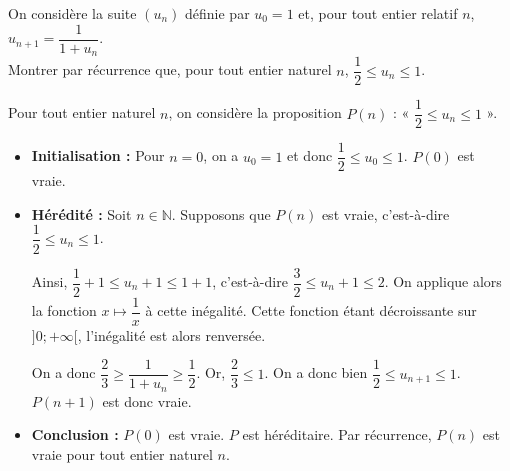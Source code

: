 \documentclass[11pt,fleqn]{book} %
\begin{document}
\begin{exercise}
On considère la suite $(u_n)$ définie par $u_0=1$ et, pour tout entier relatif $n$, $u_{n+1}=\dfrac{1}{1+u_n}$.\\ Montrer par récurrence que, pour tout entier naturel $n$, $\dfrac{1}{2} \leqslant u_n \leqslant 1$.
\end{exercise}
\begin{solution}Pour tout entier naturel $n$, on considère la proposition $P(n)$ : « $\dfrac{1}{2} \leqslant u_n \leqslant 1$ ».
\begin{itemize}
\item \textbf{Initialisation :} Pour $n=0$, on a $u_0=1$ et donc $\dfrac{1}{2}\leqslant u_0\leqslant 1$. $P(0)$ est vraie.
\item \textbf{Hérédité :} Soit $n\in\mathbb{N}$. Supposons que $P(n)$ est vraie, c'est-à-dire $\dfrac{1}{2} \leqslant u_n \leqslant 1$. 

Ainsi, $\dfrac{1}{2}+1 \leqslant u_n+1 \leqslant 1+1$, c'est-à-dire $\dfrac{3}{2} \leqslant u_n+1 \leqslant 2$. On applique alors la fonction $x\mapsto \dfrac{1}{x}$ à cette inégalité. Cette fonction étant décroissante sur $]0;+\infty[$, l'inégalité est alors renversée. 

On a donc $\dfrac{2}{3} \geqslant \dfrac{1}{1+u_n} \geqslant \dfrac{1}{2}$. Or, $\dfrac{2}{3} \leqslant 1$. On a donc bien $\dfrac{1}{2} \leqslant u_{n+1} \leqslant 1$. $P(n+1)$ est donc vraie.
\item \textbf{Conclusion :} $P(0)$ est vraie. $P$ est héréditaire. Par récurrence, $P(n)$ est vraie pour tout entier naturel $n$.
\end{itemize}\end{solution}
\end{document}
